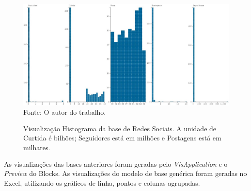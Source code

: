 \documentclass[
	12pt,				%
	openright,			%
	oneside,			%
	a4paper,			%
	english,			%
	brazil				%
	]{abntex2}
\begin{document}
	\begin{figure}[h!]
		\centering
		\caption{Visualização Histograma da base de Redes Sociais. A unidade de Curtida é bilhões; Seguidores está em milhões e Postagens está em milhares.}
		\includegraphics[width=\linewidth]{./figures/Resultados/HistogramaRS.jpg}
		\label{fig:HistogramaRS}
		\footnotesize Fonte: O autor do trabalho.
	\end{figure}





	As visualizações das bases anteriores foram geradas pelo \emph{VisApplication} e o \emph{Preview} do Blocks.
	As visualizações do modelo de base genérica foram geradas no Excel, utilizando os gráficos de linha, pontos e colunas agrupadas.
	\par
	\par
\end{document}
